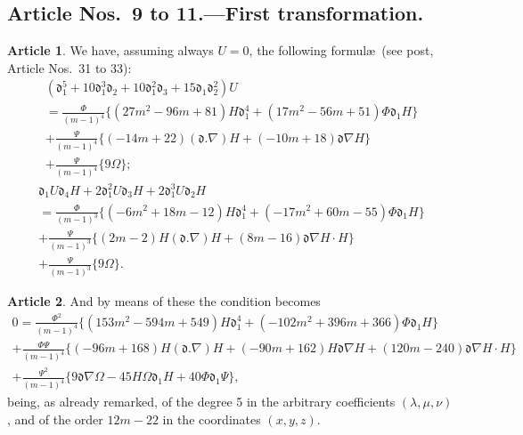 \documentclass[12pt,a4paper]{article}
\theoremstyle{definition}
\newtheorem{art}{Article}[section]
\begin{document}
\subsection*{Article Nos.\ 9 to 11.---First transformation.}

\begin{art}
We have, assuming always $U = 0$, the following formul\ae\ (see post, Article Nos.\ 31 to 33):
\begin{multline*}
(\mathfrak{d}_1^5 + 10\mathfrak{d}_1^3\mathfrak{d}_2 + 10\mathfrak{d}_1^2\mathfrak{d}_3 + 15\mathfrak{d}_1\mathfrak{d}_2^2)U \\
= \frac{\Phi}{(m - 1)^4}\{(27m^2 - 96m + 81)H\mathfrak{d}_1^4 + (17m^2 - 56m + 51)\Phi\mathfrak{d}_1 H\} \\
+ \frac{\Psi}{(m - 1)^4}\{(-14m + 22)(\mathfrak{d}.\nabla)H + (-10m + 18)\mathfrak{d}\nabla H\} \\
+ \frac{\Psi}{(m - 1)^4}\{9\Omega\};
\end{multline*}
\begin{multline*}
\mathfrak{d}_1 U\mathfrak{d}_4 H + 2\mathfrak{d}_1^2 U\mathfrak{d}_3 H + 2\mathfrak{d}_1^3 U\mathfrak{d}_2 H \\
= \frac{\Phi}{(m - 1)^3}\{(-6m^2 + 18m - 12)H\mathfrak{d}_1^4 + (-17m^2 + 60m - 55)\Phi\mathfrak{d}_1 H\} \\
+ \frac{\Psi}{(m - 1)^3}\{(2m - 2)H(\mathfrak{d}.\nabla)H + (8m - 16)\mathfrak{d}\nabla H \cdot H\} \\
+ \frac{\Psi}{(m - 1)^3}\{9\Omega\}.
\end{multline*}
\end{art}

\begin{art}
And by means of these the condition becomes
\begin{multline*}
0 = \frac{\Phi^2}{(m - 1)^4}\{(153m^2 - 594m + 549)H\mathfrak{d}_1^4 + (-102m^2 + 396m + 366)\Phi\mathfrak{d}_1 H\} \\
+ \frac{\Phi\Psi}{(m - 1)^4}\{(-96m + 168)H(\mathfrak{d}.\nabla)H + (-90m + 162)H\mathfrak{d}\nabla H + (120m - 240)\mathfrak{d}\nabla H \cdot H\} \\
+ \frac{\Psi^2}{(m - 1)^4}\{9\mathfrak{d}\nabla\Omega - 45H\Omega\mathfrak{d}_1 H + 40\Phi\mathfrak{d}_1\Psi\},
\end{multline*}
being, as already remarked, of the degree 5 in the arbitrary coefficients $(\lambda, \mu, \nu)$, and of the order $12m - 22$ in the coordinates $(x, y, z)$.
\end{art}
\end{document}
